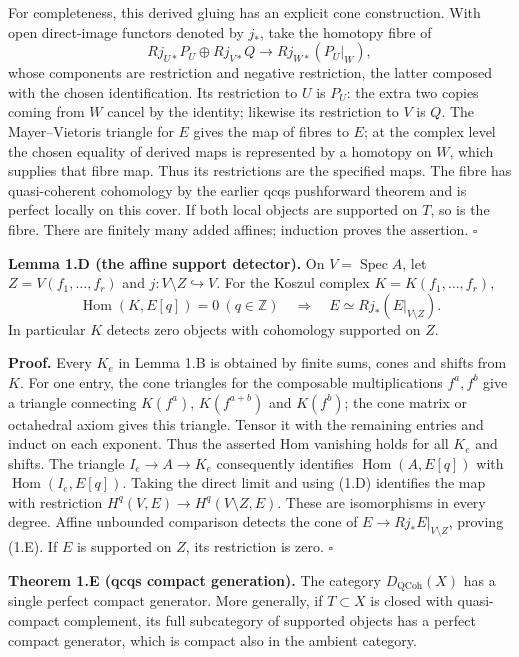 \documentclass[11pt]{article}
\begin{document}
For completeness, this derived gluing has an explicit cone construction.
With open direct-image functors denoted by \(j_*\), take the homotopy
fibre of \[
Rj_{U*}P_U\oplus Rj_{V*}Q
\longrightarrow Rj_{W*}(P_U|_W),
\] whose components are restriction and negative restriction, the latter
composed with the chosen identification. Its restriction to \(U\) is
\(P_U\): the extra two copies coming from \(W\) cancel by the identity;
likewise its restriction to \(V\) is \(Q\). The Mayer--Vietoris triangle
for \(E\) gives the map of fibres to \(E\); at the complex level the
chosen equality of derived maps is represented by a homotopy on \(W\),
which supplies that fibre map. Thus its restrictions are the specified
maps. The fibre has quasi-coherent cohomology by the earlier qcqs
pushforward theorem and is perfect locally on this cover. If both local
objects are supported on \(T\), so is the fibre. There are finitely many
added affines; induction proves the assertion. \(\square\)

\textbf{Lemma 1.D (the affine support detector).} On
\(V=\operatorname{Spec}A\), let \(Z=V(f_1,\ldots,f_r)\) and
\(j:V\setminus Z\hookrightarrow V\). For the Koszul complex
\(K=K(f_1,\ldots,f_r)\), \[
\operatorname{Hom}(K,E[q])=0\ (q\in\mathbb Z)
\quad\Longrightarrow\quad E\simeq Rj_*(E|_{V\setminus Z}).
\tag{1.E}
\] In particular \(K\) detects zero objects with cohomology supported on
\(Z\).

\textbf{Proof.} Every \(K_e\) in Lemma 1.B is obtained by finite sums,
cones and shifts from \(K\). For one entry, the cone triangles for the
composable multiplications \(f^a,f^b\) give a triangle connecting
\(K(f^a)\), \(K(f^{a+b})\) and \(K(f^b)\); the cone matrix or octahedral
axiom gives this triangle. Tensor it with the remaining entries and
induct on each exponent. Thus the asserted Hom vanishing holds for all
\(K_e\) and shifts. The triangle \(I_e\to A\to K_e\) consequently
identifies \(\operatorname{Hom}(A,E[q])\) with
\(\operatorname{Hom}(I_e,E[q])\). Taking the direct limit and using
(1.D) identifies the map with restriction
\(H^q(V,E)\to H^q(V\setminus Z,E)\). These are isomorphisms in every
degree. Affine unbounded comparison detects the cone of
\(E\to Rj_*E|_{V\setminus Z}\), proving (1.E). If \(E\) is supported on
\(Z\), its restriction is zero. \(\square\)

\textbf{Theorem 1.E (qcqs compact generation).} The category
\(D_{\mathrm{QCoh}}(X)\) has a single perfect compact generator. More
generally, if \(T\subset X\) is closed with quasi-compact complement,
its full subcategory of supported objects has a perfect compact
generator, which is compact also in the ambient category.
\end{document}
